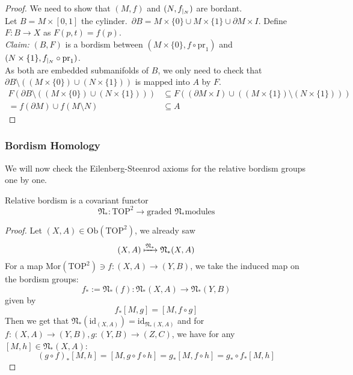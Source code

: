 \documentclass[a4paper,11pt]{article}
\begin{document}
\begin{proof}\cite{tomdieck}
    We need to show that \((M,f)\) and \((N,f_{|_{N}})\) are bordant.\\
    Let \(B=M\times [0,1]\) the cylinder.\ \(\partial B= M\times\{0\}\cup M\times\{1\}\cup \partial M\times I\). Define \(F:B\to X\) as \(F(p,t)=f(p)\).\\
    \textit{Claim:} \((B,F)\) is a bordism between \((M\times \{0\},f\circ\mathrm{pr}_1)\) and \((N\times \{1\}, f_{|_{N}}\circ\mathrm{pr}_1)\).\\
    As both are embedded submanifolds of \(B\), we only need to check that \(\partial B\setminus((M\times \{0\})\cup (N\times\{1\}))\) is mapped into \(A\) by \(F\).
    \begin{align*}
        F(\partial B\setminus((M\times \{0\})\cup (N\times\{1\})))&\subseteq F((\partial M\times I)\cup ((M\times\{1\})\setminus (N\times \{1\})))\\
        =f(\partial M)\cup f(M\setminus N)&\subseteq A
    \end{align*}
\end{proof}

\subsubsection{Bordism Homology}\label{Kap Bordism Homology}

We will now check the Eilenberg-Steenrod axioms for the relative bordism groups one by one.

\begin{lemma}\label{functoriality}
    Relative bordism is a covariant functor \[\mathfrak{N}_\ast:\mathrm{TOP}^2\to\text{graded \(\mathfrak{N}_\ast\)modules}\]
\end{lemma}

\begin{proof}\cite{brocker} 
    Let \((X,A)\in\mathrm{Ob}(\mathrm{TOP}^2)\), we already saw
    \[(X,A)\xmapsto{\mathfrak{N}_\ast}\mathfrak{N}_\ast(X,A)\]
    For a map \(\mathrm{Mor}(\mathrm{TOP}^2)\ni f:(X,A)\to(Y,B)\), we take the induced map on the bordism groups:
    \[f_\ast:=\mathfrak{N}_\ast(f):\mathfrak{N}_\ast(X,A)\to\mathfrak{N}_\ast(Y,B)\]
    given by 
    \[f_\ast[M,g] = [M,f\circ g]\]
    Then we get that \(\mathfrak{N}_\ast(\mathrm{id}_{(X,A)})=\mathrm{id}_{\mathfrak{N}_\ast(X,A)}\) and for \(f:(X,A)\to(Y,B), g:(Y,B)\to(Z,C)\), we have for any \([M,h]\in\mathfrak{N}_\ast(X,A)\):
    \[{(g\circ f)}_{\ast}[M,h]=[M,g\circ f\circ h]=g_\ast[M,f\circ h]=g_\ast\circ f_\ast[M,h]\]
\end{proof}
\end{document}
